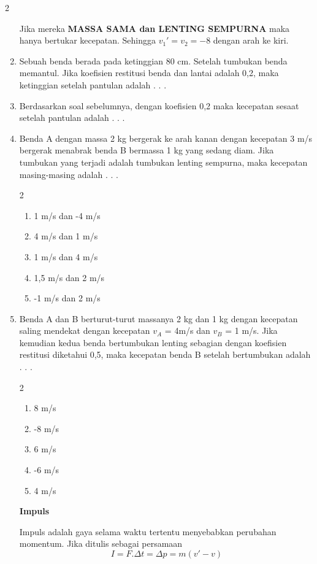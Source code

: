 \documentclass[11pt,a4paper]{extarticle}
\newcommand{\pilgani}[1]{                            \vspace{-0.3cm}\begin{multicols}{2}
 \begin{enumerate}[label=\Alph*., itemsep=0pt,topsep=0pt,leftmargin=*,align=Center]#1                     \end{enumerate}
 \phantom{ini cuma sapi, wedus, dan ayam}
 \end{multicols}}
\begin{document}
\begin{multicols*}{2}
\begin{enumerate}
{Jika mereka \textbf{MASSA SAMA dan LENTING SEMPURNA} maka hanya bertukar kecepatan. Sehingga $v_1'=v_2=-8$ dengan arah ke kiri. }

\item Sebuah benda berada pada ketinggian 80 cm. Setelah tumbukan benda memantul. Jika koefisien restitusi benda dan lantai adalah 0,2, maka ketinggian setelah pantulan adalah . . .
\vspace{3cm}


\item Berdasarkan soal sebelumnya, dengan koefisien 0,2 maka kecepatan sesaat setelah pantulan adalah . . . 
\vspace{3cm}



\item Benda A dengan massa 2 kg bergerak ke arah kanan dengan kecepatan 3 m/s bergerak menabrak benda B bermassa 1 kg yang sedang diam. Jika tumbukan yang terjadi adalah tumbukan lenting sempurna, maka kecepatan masing-masing adalah . . . 
\pilgani{
        \item 1 m/s dan -4 m/s
        \item 4 m/s dan 1 m/s
        \item 1 m/s dan 4 m/s
        \item 1,5 m/s dan 2 m/s
        \item -1 m/s dan 2 m/s
        }

\vspace{5.5cm}

\item Benda A dan B berturut-turut massanya 2 kg dan 1 kg dengan kecepatan saling mendekat dengan kecepatan $v_A$ = 4m/s dan $v_B$ = 1 m/s. Jika kemudian kedua benda bertumbukan lenting sebagian dengan koefisien restitusi diketahui 0,5, maka kecepatan benda B setelah bertumbukan adalah . . .
\pilgani{
        \item 8 m/s
        \item -8 m/s
        \item 6 m/s
        \item -6 m/s
        \item 4 m/s
        }
\vspace{6.5cm}




\textbf{ Impuls }

Impuls adalah gaya selama waktu tertentu menyebabkan perubahan momentum. Jika ditulis sebagai persamaan
$$ I = F.\Delta t = \Delta p = m(v'-v)$$



\end{enumerate}
\end{multicols*}
\end{document}

